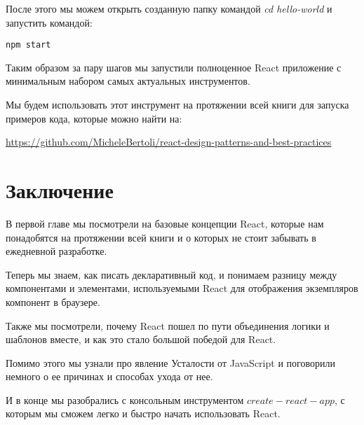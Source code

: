 После этого мы можем открыть созданную папку командой \textit{cd hello-world} и запустить командой:

\begin{lstlisting}
npm start
\end{lstlisting}

Таким образом за пару шагов мы запустили полноценное React приложение с минимальным набором самых актуальных инструментов.

Мы будем использовать этот инструмент на протяжении всей книги для запуска примеров кода, которые можно найти на:

\href{https://github.com/MicheleBertoli/react-design-patterns-and-best-practices}{https://github.com/MicheleBertoli/react-design-patterns-and-best-practices}

\section{Заключение}

В первой главе мы посмотрели на базовые концепции React, которые нам понадобятся на протяжении всей книги и о которых не стоит забывать в ежедневной разработке.

Теперь мы знаем, как писать декларативный код, и понимаем разницу между компонентами и элементами, используемыми React для отображения экземпляров компонент в браузере.

Также мы посмотрели, почему React пошел по пути объединения логики и шаблонов вместе, и как это стало большой победой для React.

Помимо этого мы узнали про явление Усталости от JavaScript и поговорили немного о ее причинах и способах ухода от нее.

И в конце мы разобрались с консольным инструментом $create-react-app$, с которым мы сможем легко и быстро начать использовать React.





